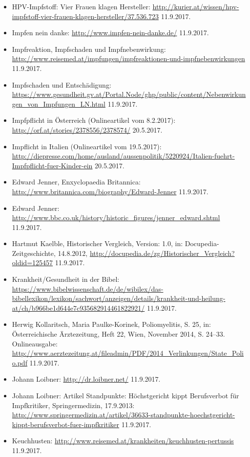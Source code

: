 \documentclass[
    a4paper,
    12pt,
    hyphens,
    chapterprefix=true,
    headheight=33pt,
    footheight=29pt,
    headings=optiontohead, %
]{scrartcl}
\begin{document}
{\begin{itemize}
\item{HPV-Impfstoff: Vier Frauen klagen Hersteller: \url{http://kurier.at/wissen/hpv-impfstoff-vier-frauen-klagen-hersteller/37.536.723} 11.9.2017.}
\item{Impfen nein danke: \url{http://www.impfen-nein-danke.de/} 11.9.2017.}
\item{Impfreaktion, Impfschaden und Impfnebenwirkung: \url{http://www.reisemed.at/impfungen/impfreaktionen-und-impfnebenwirkungen} 11.9.2017.}
\item{Impfschaden und Entschädigung: \url{https://www.gesundheit.gv.at/Portal.Node/ghp/public/content/Nebenwirkungen_von_Impfungen_LN.html} 11.9.2017.}
\item{Impfpflicht in Österreich (Onlineartikel vom 8.2.2017): \url{http://orf.at/stories/2378556/2378574/} 20.5.2017.}
\item{Impflicht in Italien (Onlineartikel vom 19.5.2017): \url{http://diepresse.com/home/ausland/aussenpolitik/5220924/Italien-fuehrt-Impfpflicht-fuer-Kinder-ein} 20.5.2017.}
\item{Edward Jenner, Enxyclopaedia Britannica: \url{http://www.britannica.com/biography/Edward-Jenner} 11.9.2017.}
\item{Edward Jenner: \url{http://www.bbc.co.uk/history/historic_figures/jenner_edward.shtml} 11.9.2017.}
\item{Hartmut Kaelble, Historischer Vergleich, Version: 1.0, in: Docupedia-Zeitgeschichte, 14.8.2012, \url{http://docupedia.de/zg/Historischer_Vergleich?oldid=125457} 11.9.2017.}
\item{Krankheit/Gesundheit in der Bibel: \url{https://www.bibelwissenschaft.de/de/wibilex/das-bibellexikon/lexikon/sachwort/anzeigen/details/krankheit-und-heilung-at/ch/b966be1d644e7c935682914461822921/} 11.9.2017.}
\item{Herwig Kollaritsch, Maria Paulke-Korinek, Poliomyelitis, S. 25, in: Österreichische Ärztezeitung, Heft 22, Wien, November 2014, S. 24--33. Onlineausgabe: \url{http://www.aerztezeitung.at/fileadmin/PDF/2014_Verlinkungen/State_Polio.pdf} 11.9.2017.}
\item{Johann Loibner: \url{http://dr.loibner.net/} 11.9.2017.}
\item{Johann Loibner: Artikel Standpunkte: Höchstgericht kippt Berufsverbot für Impfkritiker, Springermedizin, 17.9.2013: \url{http://www.springermedizin.at/artikel/36633-standpunkte-hoechstgericht-kippt-berufsverbot-fuer-impfkritiker} 11.9.2017.}
\item{Keuchhusten: \url{http://www.reisemed.at/krankheiten/keuchhusten-pertussis} 11.9.2017.}

\end{itemize}}
\end{document}
